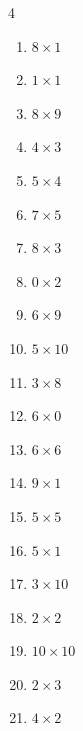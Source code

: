 \begin{multicols}{4}
\begin{enumerate}
  \item $8\times 1$
        \phantom{$=8$}

  \item $1\times 1$
        \phantom{$=1$}

  \item $8\times 9$
        \phantom{$=72$}

  \item $4\times 3$
        \phantom{$=12$}

  \item $5\times 4$
        \phantom{$=20$}

  \item $7\times 5$
        \phantom{$=35$}

  \item $8\times 3$
        \phantom{$=24$}

  \item $0\times 2$
        \phantom{$=0$}

  \item $6\times 9$
        \phantom{$=54$}

  \item $5\times 10$
        \phantom{$=50$}

  \item $3\times 8$
        \phantom{$=24$}

  \item $6\times 0$
        \phantom{$=0$}

  \item $6\times 6$
        \phantom{$=36$}

  \item $9\times 1$
        \phantom{$=9$}

  \item $5\times 5$
        \phantom{$=25$}

  \item $5\times 1$
        \phantom{$=5$}

  \item $3\times 10$
        \phantom{$=30$}

  \item $2\times 2$
        \phantom{$=4$}

  \item $10\times 10$
        \phantom{$=100$}

  \item $2\times 3$
        \phantom{$=6$}

  \item $4\times 2$
        \phantom{$=8$}


\end{enumerate}
\end{multicols}
